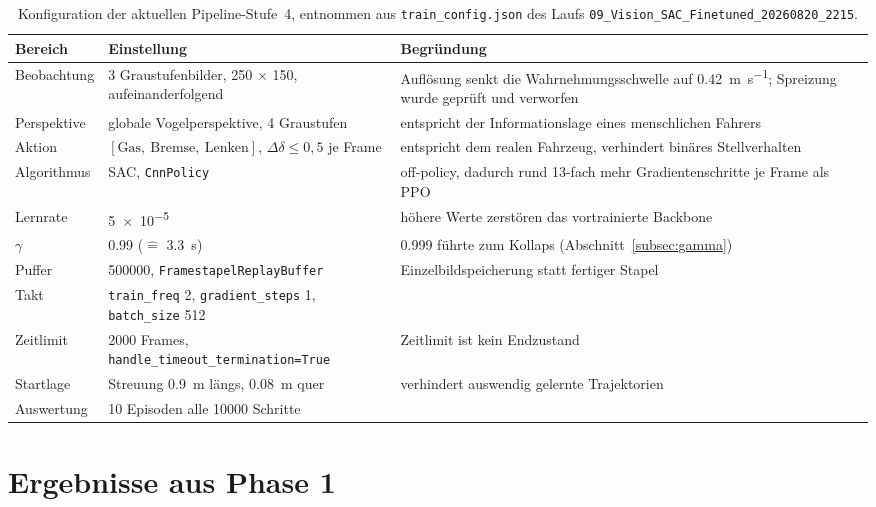 \begin{table}[htbp]
  \centering
  \caption{Konfiguration der aktuellen Pipeline-Stufe~4, entnommen aus \texttt{train\_config.json} des Laufs \texttt{09\_Vision\_SAC\_Finetuned\_20260820\_2215}.}
  \label{tab:pipeline_config}
  \small
  \begin{tabularx}{\linewidth}{@{}l l X@{}}
    \toprule
    \textbf{Bereich} & \textbf{Einstellung} & \textbf{Begründung} \\
    \midrule
    Beobachtung & 3 Graustufenbilder, \num{250} $\times$ \num{150}, aufeinanderfolgend & Auflösung senkt die Wahrnehmungsschwelle auf \SI{0.42}{\meter\per\second}; Spreizung wurde geprüft und verworfen \\
    Perspektive & globale Vogelperspektive, 4 Graustufen & entspricht der Informationslage eines menschlichen Fahrers \\
    Aktion      & $[\text{Gas},\ \text{Bremse},\ \text{Lenken}]$, $\Delta\delta \le 0{,}5$ je Frame & entspricht dem realen Fahrzeug, verhindert binäres Stellverhalten \\
    Algorithmus & \ac{SAC}, \texttt{CnnPolicy} & off-policy, dadurch rund 13-fach mehr Gradientenschritte je Frame als \ac{PPO} \\
    Lernrate    & \num{5e-5} & höhere Werte zerstören das vortrainierte Backbone \\
    $\gamma$    & \num{0.99} ($\hat{=}$ \SI{3.3}{\second}) & \num{0.999} führte zum Kollaps (Abschnitt~\ref{subsec:gamma}) \\
    Puffer      & \num{500000}, \texttt{FramestapelReplayBuffer} & Einzelbildspeicherung statt fertiger Stapel \\
    Takt        & \texttt{train\_freq} \num{2}, \texttt{gradient\_steps} \num{1}, \texttt{batch\_size} \num{512} & \\
    Zeitlimit   & \num{2000} Frames, \texttt{handle\_timeout\_termination=True} & Zeitlimit ist kein Endzustand \\
    Startlage   & Streuung \SI{0.9}{\meter} längs, \SI{0.08}{\meter} quer & verhindert auswendig gelernte Trajektorien \\
    Auswertung  & \num{10} Episoden alle \num{10000} Schritte & \\
    \bottomrule
  \end{tabularx}
\end{table}

\section{Ergebnisse aus Phase 1}
\label{sec:ergebnisse_quantitativ}


